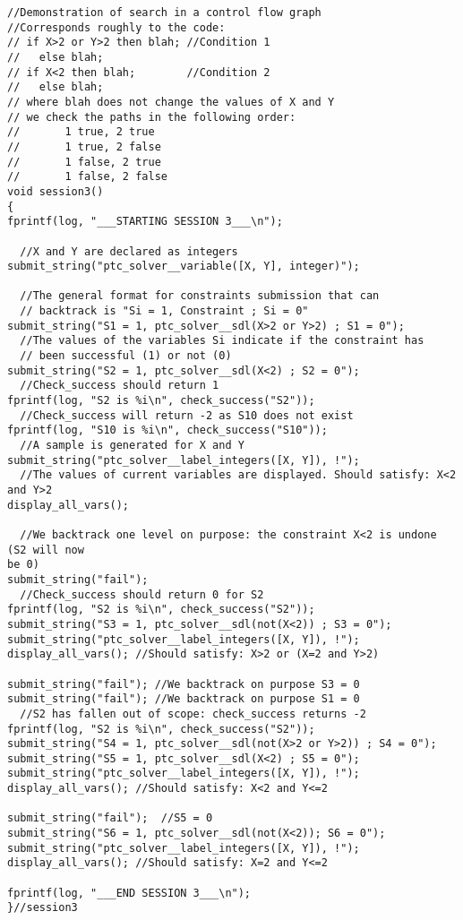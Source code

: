 \documentclass{article}
\begin{document}
\begin{verbatim}
//Demonstration of search in a control flow graph
//Corresponds roughly to the code:
// if X>2 or Y>2 then blah; //Condition 1
//   else blah;
// if X<2 then blah;        //Condition 2
//   else blah;
// where blah does not change the values of X and Y
// we check the paths in the following order:
//       1 true, 2 true
//       1 true, 2 false
//       1 false, 2 true
//       1 false, 2 false
void session3()
{
fprintf(log, "___STARTING SESSION 3___\n");

  //X and Y are declared as integers
submit_string("ptc_solver__variable([X, Y], integer)");

  //The general format for constraints submission that can
  // backtrack is "Si = 1, Constraint ; Si = 0"
submit_string("S1 = 1, ptc_solver__sdl(X>2 or Y>2) ; S1 = 0");
  //The values of the variables Si indicate if the constraint has
  // been successful (1) or not (0)
submit_string("S2 = 1, ptc_solver__sdl(X<2) ; S2 = 0");
  //Check_success should return 1
fprintf(log, "S2 is %i\n", check_success("S2"));
  //Check_success will return -2 as S10 does not exist
fprintf(log, "S10 is %i\n", check_success("S10"));
  //A sample is generated for X and Y
submit_string("ptc_solver__label_integers([X, Y]), !");
  //The values of current variables are displayed. Should satisfy: X<2 and Y>2
display_all_vars();

  //We backtrack one level on purpose: the constraint X<2 is undone (S2 will now
be 0)
submit_string("fail");
  //Check_success should return 0 for S2
fprintf(log, "S2 is %i\n", check_success("S2"));
submit_string("S3 = 1, ptc_solver__sdl(not(X<2)) ; S3 = 0");
submit_string("ptc_solver__label_integers([X, Y]), !");
display_all_vars(); //Should satisfy: X>2 or (X=2 and Y>2)

submit_string("fail"); //We backtrack on purpose S3 = 0
submit_string("fail"); //We backtrack on purpose S1 = 0
  //S2 has fallen out of scope: check_success returns -2
fprintf(log, "S2 is %i\n", check_success("S2"));
submit_string("S4 = 1, ptc_solver__sdl(not(X>2 or Y>2)) ; S4 = 0");
submit_string("S5 = 1, ptc_solver__sdl(X<2) ; S5 = 0");
submit_string("ptc_solver__label_integers([X, Y]), !");
display_all_vars(); //Should satisfy: X<2 and Y<=2

submit_string("fail");  //S5 = 0
submit_string("S6 = 1, ptc_solver__sdl(not(X<2)); S6 = 0");
submit_string("ptc_solver__label_integers([X, Y]), !");
display_all_vars(); //Should satisfy: X=2 and Y<=2

fprintf(log, "___END SESSION 3___\n");
}//session3
\end{verbatim}
\end{document}
